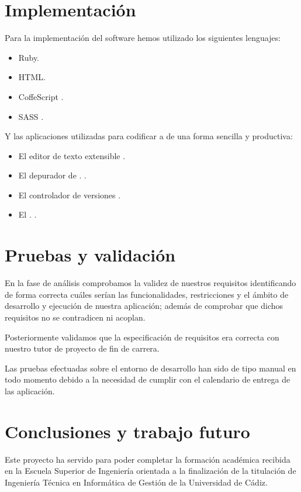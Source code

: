 \newpage

\clearpage
\section{Implementación}
Para la implementación del software hemos utilizado los siguientes lenguajes:

\begin{itemize}
\item Ruby.
\item HTML.
\item CoffeScript \cite{lang:coffescript}.
\item SASS \cite{lang:sass}.
\end{itemize}

Y las aplicaciones utilizadas para codificar a de una forma sencilla y
productiva:

\begin{itemize}
\item El editor de texto extensible  \cite{prog:sublimetext2}.
\item El depurador de  \cite{prog:firefox} .
  \cite{prog:firebug}.
\item El controlador de versiones  \cite{wiki:GIT}.
\item El  .
  \cite{prog:twitter_bootstrap}.
\end{itemize}

\section{Pruebas y validación}
En la fase de análisis comprobamos la validez de nuestros requisitos
identificando de forma correcta cuáles serían las funcionalidades, restricciones
y el ámbito de desarrollo y ejecución de nuestra aplicación; además de comprobar
que dichos requisitos no se contradicen ni acoplan.

Posteriormente validamos que la especificación de requisitos era correcta con
nuestro tutor de proyecto de fin de carrera.

Las pruebas efectuadas sobre el entorno de desarrollo han sido de tipo manual en
todo momento debido a la necesidad de cumplir con el calendario de entrega de
las aplicación.

\section{Conclusiones y trabajo futuro}
Este proyecto ha servido para poder completar la formación académica recibida en
la Escuela Superior de Ingeniería orientada a la finalización de la titulación
de Ingeniería Técnica en Informática de Gestión de la Universidad de Cádiz.

